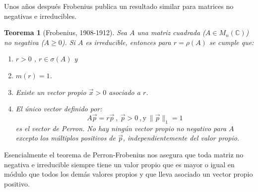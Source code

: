 \documentclass[size=a4, parskip=half, titlepage=false, toc=flat, toc=bib, 12pt]{scrartcl}
\theoremstyle{theorem-style}
\newtheorem{nth}{Teorema}[section]
\theoremstyle{definition-style}
\theoremstyle{remark-style}
\theoremstyle{example-style}
\theoremstyle{definition-style}
\theoremstyle{remark-style}
\begin{document}
Unos años después Frobenius publica un resultado similar para matrices no negativas e irreducibles.

\begin{nth}[Frobenius, 1908-1912]
Sea $A $ una matriz cuadrada ($A \in M_n(\mathbb{C})$) no negativa ($A \geq 0$). Si $A$ es irreducible, entonces para $r = \rho(A)$ se cumple que:
\begin{enumerate}
\item $r >0$ , $r \in \sigma(A)$ y
\item $m(r) = 1$.
\item Existe un vector propio $\vec{x} > 0$ asociado a $r$.
\item El único vector definido por:
$$A \vec{p} = r \vec{p}  \ , \ \vec{p}> 0 \ , \textrm{y} \ \|\vec{p}\|_1 = 1 $$
es el vector de Perron. No hay ningún vector propio no negativo para $A$ excepto los múltiplos positivos de $\vec{p}$, independientemente del valor propio.
\end{enumerate}
\end{nth}

Esencialmente el teorema de Perron-Frobenius nos asegura que toda matriz no negativa e irreducible siempre tiene un valor propio que es mayor o igual en módulo que todos los demás valores propios y que lleva asociado un vector propio positivo.
\end{document}
